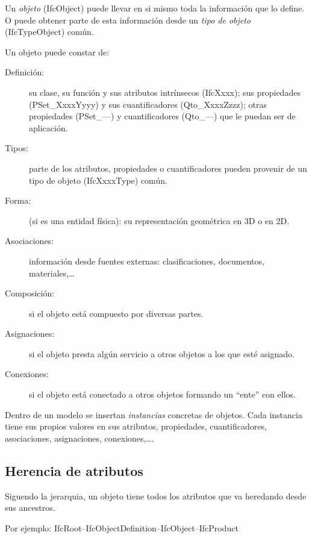 \documentclass[spanish,12pt,a4paper,final,oneside]{book}
\begin{document}
Un \textit{objeto} (IfcObject) puede llevar en si mismo toda la información que lo define. O puede obtener parte de esta información desde un \textit{tipo de objeto} (IfcTypeObject) común. 

Un objeto puede constar de:
\begin{description}
\item[Definición:] su clase, su función y sus atributos intrínsecos (IfcXxxx); sus propiedades (PSet\_XxxxYyyy) y sus cuantificadores (Qto\_XxxxZzzz); otras propiedades (PSet\_---) y cuantificadores (Qto\_---) que le puedan ser de aplicación.
\item[Tipos:] parte de los atributos, propiedades o cuantificadores pueden provenir de un tipo de objeto (IfcXxxxType) común.
\item[Forma:] (si es una entidad física): su representación geométrica en 3D o en 2D.
\item[Asociaciones:] información desde fuentes externas: clasificaciones, documentos, materiales,\ldots
\item[Composición:] si el objeto está compuesto por diversas partes.
\item[Asignaciones:] si el objeto presta algún servicio a otros objetos a los que esté asignado.
\item[Conexiones:] si el objeto está conectado a otros objetos formando un ``ente'' con ellos.
\end{description}

Dentro de un modelo se insertan \textit{instancias} concretas de objetos. Cada instancia tiene sus propios valores en sus atributos, propiedades, cuantificadores, asociaciones, asignaciones, conexiones,\ldots. 

\subsection{Herencia de atributos}
Siguendo la jerarquia, un objeto tiene todos los atributos que va heredando desde sus ancestros.

Por ejemplo: IfcRoot--IfcObjectDefinition--IfcObject--IfcProduct
\end{document}

